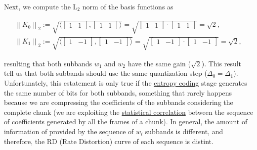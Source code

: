 Next, we compute the L$_2$ norm of the basis functions as

\begin{equation}
  \begin{array}{l}
    \left\| K_0 \right\|_2 := \sqrt{\langle \begin{bmatrix}1 & 1\end{bmatrix}, \begin{bmatrix}1 & 1\end{bmatrix} \rangle} = \sqrt{\begin{bmatrix}1 & 1\end{bmatrix}\cdot \begin{bmatrix}1 & 1\end{bmatrix}} = \sqrt{2},\\
    \left\| K_1 \right\|_2 := \sqrt{\langle \begin{bmatrix}1 & -1\end{bmatrix}, \begin{bmatrix}1 & -1\end{bmatrix} \rangle} = \sqrt{\begin{bmatrix}1 & -1\end{bmatrix}\cdot \begin{bmatrix}1 & -1\end{bmatrix}} = \sqrt{2},
  \end{array}
\end{equation}

resulting that both subbands $w_1$ and $w_2$ have the same gain
($\sqrt{2}$). This result tell us that both subbands should use the
same quantization step ($\Delta_0=\Delta_1$). Unfortunately, this
estatement is only true if the
\href{https://en.wikipedia.org/wiki/Entropy_encoding}{entropy coding}
stage generates the same number of bits for both subbands, something
that rarely happens because we are compressing the coefficients of the
subbands considering the complete chunk (we are exploiting the
\href{https://en.wikipedia.org/wiki/Correlation_and_dependence}{statistical
  correlation} between the sequence of coefficients generated by all
the frames of a chunk). In general, the amount of information of
provided by the sequence of $w_i$ subbands is different, and therefore,
the RD (Rate Distortion) curve of each sequence is distint.


